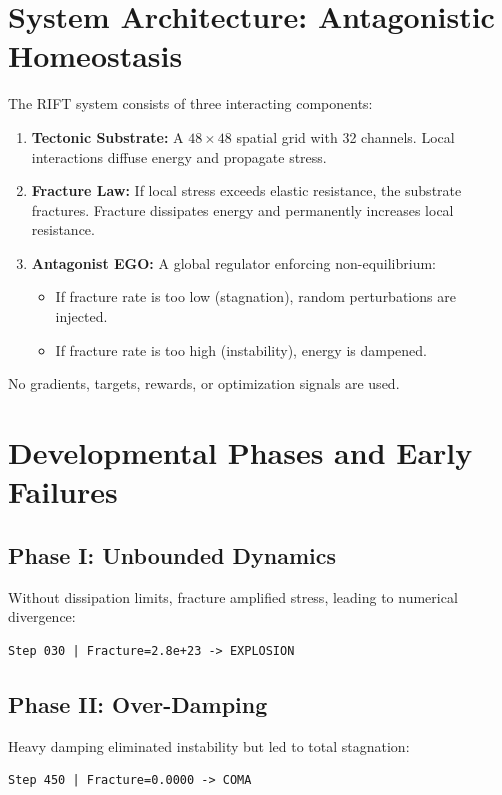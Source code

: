 \documentclass[11pt, a4paper]{article}
\begin{document}
\section{System Architecture: Antagonistic Homeostasis}

The RIFT system consists of three interacting components:

\begin{enumerate}
    \item \textbf{Tectonic Substrate:} A $48 \times 48$ spatial grid with 32 channels. Local interactions diffuse energy and propagate stress.
    \item \textbf{Fracture Law:} If local stress exceeds elastic resistance, the substrate fractures. Fracture dissipates energy and permanently increases local resistance.
    \item \textbf{Antagonist EGO:} A global regulator enforcing non-equilibrium:
    \begin{itemize}
        \item If fracture rate is too low (stagnation), random perturbations are injected.
        \item If fracture rate is too high (instability), energy is dampened.
    \end{itemize}
\end{enumerate}

No gradients, targets, rewards, or optimization signals are used.

\section{Developmental Phases and Early Failures}

\subsection{Phase I: Unbounded Dynamics}
Without dissipation limits, fracture amplified stress, leading to numerical divergence:
\begin{lstlisting}
Step 030 | Fracture=2.8e+23 -> EXPLOSION
\end{lstlisting}

\subsection{Phase II: Over-Damping}
Heavy damping eliminated instability but led to total stagnation:
\begin{lstlisting}
Step 450 | Fracture=0.0000 -> COMA
\end{lstlisting}
\end{document}
